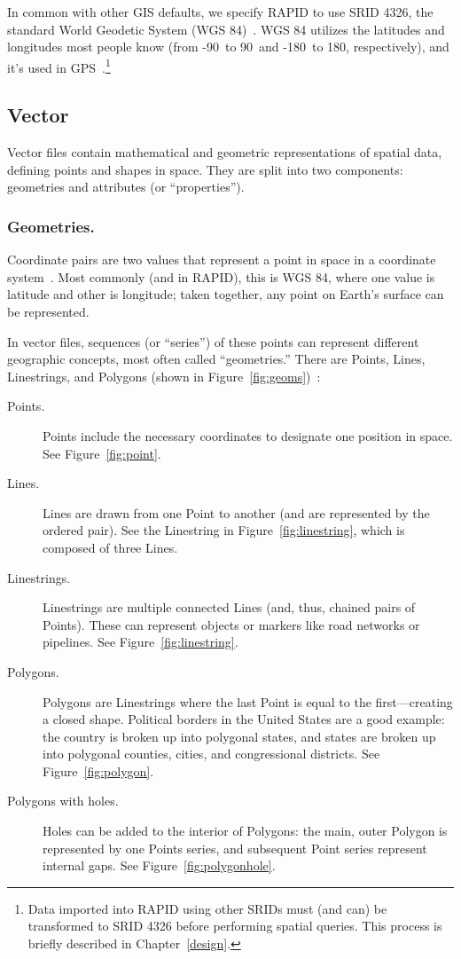 In common with other GIS defaults, we specify RAPID to use SRID 4326, the standard World Geodetic System (WGS 84)~\cite{Nima2000,SFA}. WGS 84 utilizes the latitudes and longitudes most people know (from -90\textdegree~to 90\textdegree~and -180\textdegree~to 180\textdegree, respectively), and it's used in GPS~\cite{Nima2000}.\footnote{Data imported into RAPID using other SRIDs must (and can) be transformed to SRID 4326 before performing spatial queries. This process is briefly described in Chapter~\ref{design}.}

\subsection{Vector}
\label{sec:vector}
Vector files contain mathematical and geometric representations of spatial data, defining points and shapes in space. They are split into two components: geometries and attributes (or ``properties'').

\subsubsection{Geometries.}
Coordinate pairs are two values that represent a point in space in a coordinate system~\cite{gentle_intro}. Most commonly (and in RAPID), this is WGS 84, where one value is latitude and other is longitude; taken together, any point on Earth's surface can be represented.

In vector files, sequences (or ``series'') of these points can represent different geographic concepts, most often called ``geometries.'' There are Points, Lines, Linestrings, and Polygons (shown in Figure~\ref{fig:geoms})~\cite{gentle_intro}:

\begin{description}
  \item[Points.] Points include the necessary coordinates to designate one position in space. See Figure~\ref{fig:point}.
  \item[Lines.] Lines are drawn from one Point to another (and are represented by the ordered pair). See the Linestring in Figure~\ref{fig:linestring}, which is composed of three Lines.
  \item[Linestrings.] Linestrings are multiple connected Lines (and, thus, chained pairs of Points). These can represent objects or markers like road networks or pipelines. See Figure~\ref{fig:linestring}.
  \item[Polygons.] Polygons are Linestrings where the last Point is equal to the first---creating a closed shape. Political borders in the United States are a good example: the country is broken up into polygonal states, and states are broken up into polygonal counties, cities, and congressional districts. See Figure~\ref{fig:polygon}.
  \item[Polygons with holes.] Holes can be added to the interior of Polygons: the main, outer Polygon is represented by one Points series, and subsequent Point series represent internal gaps. See Figure~\ref{fig:polygonhole}.
\end{description}



